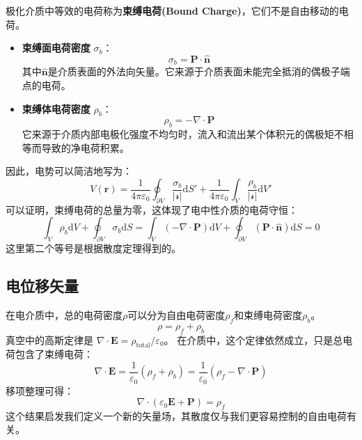 \documentclass[fontset=none]{ctexart}
\begin{document}
\begin{definition}[束缚电荷]
    极化介质中等效的电荷称为\textbf{束缚电荷(Bound Charge)}，它们不是自由移动的电荷。
    \begin{itemize}
        \item \textbf{束缚面电荷密度} $\sigma_b$：
        \begin{equation}
            \sigma_b = \bm{P} \cdot \hat{\bm{n}}
        \end{equation}
        其中$\hat{\bm{n}}$是介质表面的外法向矢量。它来源于介质表面未能完全抵消的偶极子端点的电荷。
        \item \textbf{束缚体电荷密度} $\rho_b$：
        \begin{equation}
            \rho_b = -\nabla \cdot \bm{P}
        \end{equation}
        它来源于介质内部电极化强度不均匀时，流入和流出某个体积元的偶极矩不相等而导致的净电荷积累。
    \end{itemize}
\end{definition}
因此，电势可以简洁地写为：
\begin{equation}
    V(\bm{r}) = \frac{1}{4\pi\varepsilon_0} \oint_{\partial V} \frac{\sigma_b}{|\bm{\mathscr{r}}|} 
    \mathrm{d}S' + \frac{1}{4\pi\varepsilon_0} \int_V \frac{\rho_b}{|\bm{\mathscr{r}}|} \mathrm{d}V'
\end{equation}
可以证明，束缚电荷的总量为零，这体现了电中性介质的电荷守恒：
\begin{equation}
    \int_V \rho_b \mathrm{d}V + \oint_{\partial V} \sigma_b \mathrm{d}S 
    = \int_V (-\nabla \cdot \bm{P}) \mathrm{d}V + \oint_{\partial V} (\bm{P} \cdot \hat{\bm{n}}) 
    \mathrm{d}S = 0
\end{equation}
这里第二个等号是根据散度定理得到的。

\subsection{电位移矢量}
在电介质中，总的电荷密度$\rho$可以分为自由电荷密度$\rho_f$和束缚电荷密度$\rho_b$。
\begin{equation}
    \rho = \rho_f + \rho_b
\end{equation}
真空中的高斯定律是 $\nabla \cdot \bm{E} = \rho_{\text{total}} / \varepsilon_0$。
在介质中，这个定律依然成立，只是总电荷包含了束缚电荷：
\begin{equation}
    \nabla \cdot \bm{E} = \frac{1}{\varepsilon_0} (\rho_f + \rho_b) = \frac{1}{\varepsilon_0} 
    (\rho_f - \nabla \cdot \bm{P})
\end{equation}
移项整理可得：
\begin{equation}
    \nabla \cdot (\varepsilon_0 \bm{E} + \bm{P}) = \rho_f
\end{equation}
这个结果启发我们定义一个新的矢量场，其散度仅与我们更容易控制的自由电荷有关。
\end{document}

